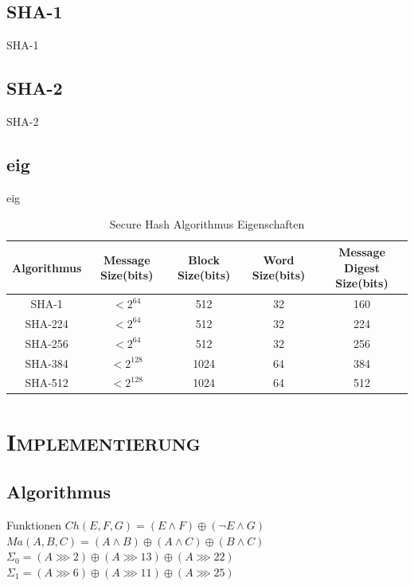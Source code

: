 \documentclass[xcolor=x11names,compress]{beamer}
\renewcommand{\(}{\begin{columns}}
\renewcommand{\)}{\end{columns}}
\newcommand{\<}[1]{\begin{column}{#1}}
\renewcommand{\>}{\end{column}}
\begin{document}
\subsection{SHA-1}
\begin{frame}{SHA-1}

\end{frame}


\subsection{SHA-2}
\begin{frame}{SHA-2}

\end{frame}

\subsection{eig}
\begin{frame}[shrink=35]{eig}
\begin{table}[c]
\caption{Secure Hash Algorithmus Eigenschaften}
\begin{tabular}[ht]{|c|c|c|c|c|}
  \hline
  Algorithmus & Message Size(bits) & Block Size(bits) & Word Size(bits) & Message Digest Size(bits)\\
  \hline\hline
  SHA-1   & $<2^{64}$  &  512 & 32 & 160\\
  SHA-224 & $<2^{64}$  &  512 & 32 & 224\\
  SHA-256 & $<2^{64}$  &  512 & 32 & 256\\
  SHA-384 & $<2^{128}$ & 1024 & 64 & 384\\  
  SHA-512 & $<2^{128}$ & 1024 & 64 & 512\\  
  \hline
\end{tabular}
\label{tab:meinetabelle}
\end{table}
\end{frame}


\section{\scshape Implementierung}
\subsection{Algorithmus}
\begin{frame}{Funktionen}
$ Ch(E,F,G) = (E\wedge F) \oplus (\neg E\wedge G)$
$ Ma(A,B,C) = (A\wedge B) \oplus (A\wedge C) \oplus (B\wedge C)$\\
$ \Sigma_0 = (A\ggg 2) \oplus (A\ggg 13) \oplus (A\ggg 22) $\\
$ \Sigma_1 = (A\ggg 6) \oplus (A\ggg 11) \oplus (A\ggg 25) $\\
\end{frame}
\end{document}
